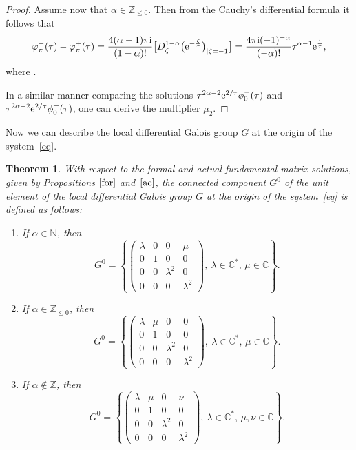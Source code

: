 \documentclass[10pt,a4paper]{amsart}
\numberwithin{equation}{section}
\newtheorem{Theorem}{Theorem}[section]
\begin{document}
\begin{proof}
 Assume now that $\alpha\in\mathbb{Z}_{\leq 0}$. Then from the Cauchy's differential formula it follows that
 \[
 \varphi^{-}_{\pi}(\tau) - \varphi^{+}_{\pi}(\tau)
 =
 \frac{4 (\alpha-1) \pi {\rm i}}{(1-\alpha)!}
 \bigl[ D_{\zeta}^{1-\alpha} \bigl({\rm e}^{-\frac{\zeta}{\tau}}\bigr)_{| \zeta=-1}\bigr]
 =\frac{4 \pi {\rm i} (-1)^{-\alpha}}{(-\alpha)!} \tau^{\alpha-1} {\rm e}^{\frac{1}{\tau}} ,
 \]
 where .

 In a similar manner comparing the solutions $ \tau^{2 \alpha-2} {\rm e}^{2/\tau} \phi_0^{-}(\tau)$ and $ \tau^{2 \alpha-2} {\rm e}^{2/\tau} \phi_0^{+}(\tau)$,
 one can derive the multiplier $\mu_2$.
\end{proof}

 Now we can describe the local differential Galois group $G$ at the origin of the system~\eqref{eq}.

 \begin{Theorem}\label{gal-inf}
 With respect to the formal and actual fundamental matrix solutions, given by Propositions $\ref{for}$ and~$\ref{ac}$, the connected
 component $G^0$ of the unit element of the local differential Galois group $G$ at the origin of the system~\eqref{eq} is
 defined as follows:
 \begin{enumerate}
 \itemsep=0pt 	
 \item[$1.$]
 	If $\alpha\in\mathbb{N}$, then
 	\[
 	 G^0=\left\{\begin{pmatrix}
 	 \lambda & 0 & 0 & \mu\\
 	 0 & 1 & 0 & 0\\
 	 0 & 0 & \lambda^2 & 0\\
 	 0 & 0 & 0 & \lambda^2
 	 \end{pmatrix}, \ 	 \lambda\in\mathbb{C}^*,\, \mu\in\mathbb{C}\right\} .
 	\]
 	
 \item[$2.$]
 If $\alpha\in\mathbb{Z}_{\leq 0}$, then
 		\[
 		G^0=\left\{\begin{pmatrix}
 		\lambda & \mu & 0 & 0\\
 		0 & 1 & 0 & 0\\
 		0 & 0 & \lambda^2 & 0\\
 		0 & 0 & 0 & \lambda^2
 		\end{pmatrix}, \
 		\lambda\in\mathbb{C}^*,\, \mu\in\mathbb{C}\right\} .
 		\]
 		
 \item[$3.$]
 If $\alpha\notin\mathbb{Z}$, then
 	\[
 	G^0=\left\{\begin{pmatrix}
 	\lambda & \mu & 0 & \nu\\
 	0 & 1 & 0 & 0\\
 	0 & 0 & \lambda^2 & 0\\
 	0 & 0 & 0 & \lambda^2
 	\end{pmatrix}, \
 	\lambda\in\mathbb{C}^*,\, \mu, \nu\in\mathbb{C}\right\} .
 	\] 		
 	\end{enumerate}
 \end{Theorem}
\end{document}

